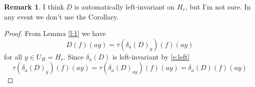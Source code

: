 \documentclass{article}
\theoremstyle{definition}
\newtheorem{rem}[thm]{Remark}
\numberwithin{equation}{section}
\renewcommand{\-}{\hyp{}}
\begin{document}
\begin{rem}
I think $D$ is automatically left-invariant on $H_r$, but I'm not sure. In any event we don't use the Corollary.
\end{rem}

\begin{proof}
 From Lemma \ref{l:1} we have 
  $$
  D(f)(ay)=\tau(\delta_a(D)_y)(f)(ay)
  $$
  for all $y\in U_H=H_r$. Since $\delta_a(D)$ is left-invariant by \eqref{e:left}
  $$
  \tau(\delta_a(D)_y)(f)(ay)=  \tau(\delta_a(D)_{ay})(f)(ay)=\delta_a(D)(f)(ay)
  $$
\end{proof}




%

\end{document}
